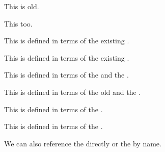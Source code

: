 \documentclass[minimal]{omdoc}
\begin{document}
\begin{module}[id=foo]
  \begin{definition}[id=test.one]
    This  is old.

    This  too.
  \end{definition}

  \begin{definition}
    This  is defined in terms of the existing .

    This  is defined in terms of the existing .
  \end{definition}

  \begin{definition}
    This  is defined in terms of the  and the 
    . 

    This  is defined in terms of the old
     and the .
  \end{definition}

  \begin{definition}
    This  is defined in terms of the
    .
    
    This  is defined in terms of the
    .
  \end{definition}
  We can also reference the  directly or the
   by name.
\end{module}
\end{document}

